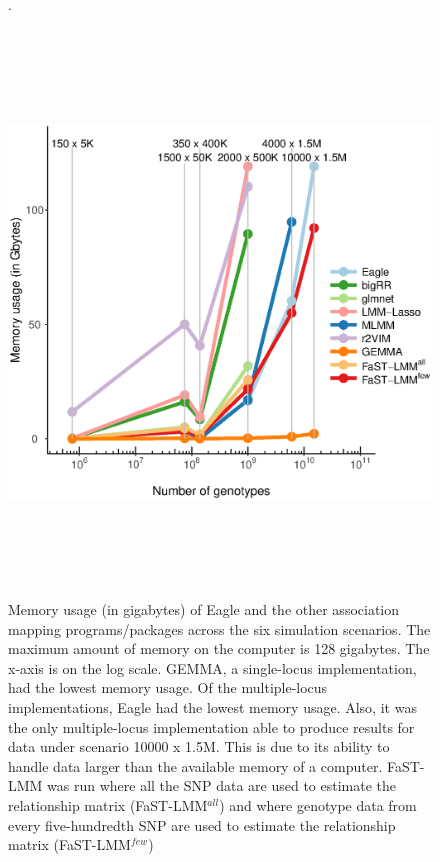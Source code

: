 \documentclass{article}
\begin{document}
\begin{figure}
\caption{Memory usage (in gigabytes) of Eagle and the other association mapping programs/packages across 
the six simulation scenarios. The maximum amount of memory on the computer is 128 gigabytes. 
The x-axis is on the log scale. GEMMA, a single-locus implementation, had the lowest memory usage. 
Of the multiple-locus implementations, Eagle had the lowest memory usage. Also, it 
was the only multiple-locus 
implementation able to produce results for data under  scenario 10000 x 1.5M. This is due to its ability 
to handle data larger than the available memory of a computer. FaST-LMM was run where all the SNP data are used 
to estimate the relationship matrix (FaST-LMM$^{all}$)   and where genotype data from every five-hundredth SNP are used to 
estimate the relationship matrix (FaST-LMM$^{few}$)}.
\label{supfigmem}

\begin{center}
\includegraphics[width=15cm, height=15cm]{mem.eps}
\end{center}
\end{figure}
\end{document}
